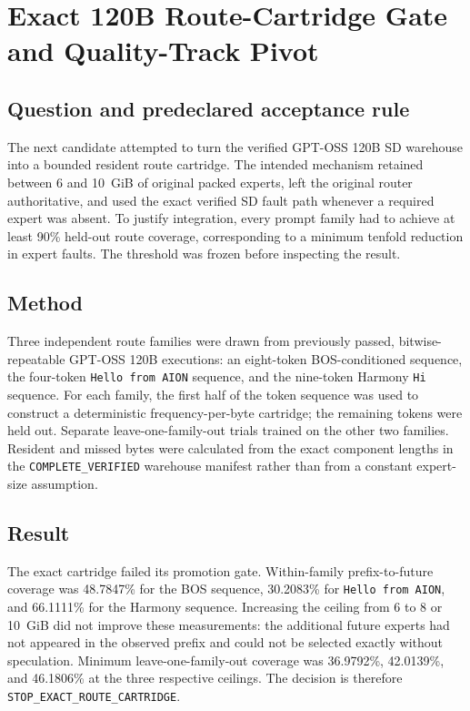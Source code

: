 \section{Exact 120B Route-Cartridge Gate and Quality-Track Pivot}
\label{sec:gptoss-120b-route-cartridge}

\subsection{Question and predeclared acceptance rule}

The next candidate attempted to turn the verified GPT-OSS 120B SD warehouse
into a bounded resident route cartridge.  The intended mechanism retained
between 6 and 10~GiB of original packed experts, left the original router
authoritative, and used the exact verified SD fault path whenever a required
expert was absent.  To justify integration, every prompt family had to achieve
at least 90\% held-out route coverage, corresponding to a minimum tenfold
reduction in expert faults.  The threshold was frozen before inspecting the
result.

\subsection{Method}

Three independent route families were drawn from previously passed,
bitwise-repeatable GPT-OSS 120B executions: an eight-token BOS-conditioned
sequence, the four-token \texttt{Hello from AION} sequence, and the nine-token
Harmony \texttt{Hi} sequence.  For each family, the first half of the token
sequence was used to construct a deterministic frequency-per-byte cartridge;
the remaining tokens were held out.  Separate leave-one-family-out trials
trained on the other two families.  Resident and missed bytes were calculated
from the exact component lengths in the \texttt{COMPLETE\_VERIFIED} warehouse
manifest rather than from a constant expert-size assumption.

\subsection{Result}

The exact cartridge failed its promotion gate.  Within-family prefix-to-future
coverage was 48.7847\% for the BOS sequence, 30.2083\% for
\texttt{Hello from AION}, and 66.1111\% for the Harmony sequence.  Increasing
the ceiling from 6 to 8 or 10~GiB did not improve these measurements: the
additional future experts had not appeared in the observed prefix and could not
be selected exactly without speculation.  Minimum leave-one-family-out coverage
was 36.9792\%, 42.0139\%, and 46.1806\% at the three respective ceilings.  The
decision is therefore \texttt{STOP\_EXACT\_ROUTE\_CARTRIDGE}.

